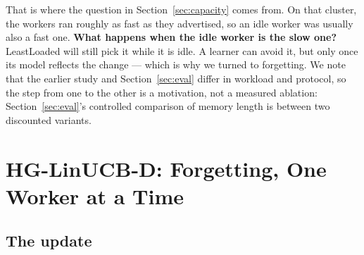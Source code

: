 \documentclass[final,5p,times,twocolumn]{elsarticle}
\begin{document}
That is where the question in Section~\ref{sec:capacity} comes from. On that cluster, the workers ran roughly as fast as they advertised, so an idle worker was usually also a fast one. \textbf{What happens when the idle worker is the slow one?} LeastLoaded will still pick it while it is idle. A learner can avoid it, but only once its model reflects the change --- which is why we turned to forgetting. We note that the earlier study and Section~\ref{sec:eval} differ in workload and protocol, so the step from one to the other is a motivation, not a measured ablation: Section~\ref{sec:eval}'s controlled comparison of memory length is between two discounted variants.

\section{HG-LinUCB-D: Forgetting, One Worker at a Time}
\label{sec:hgd}

\subsection{The update}
\end{document}
